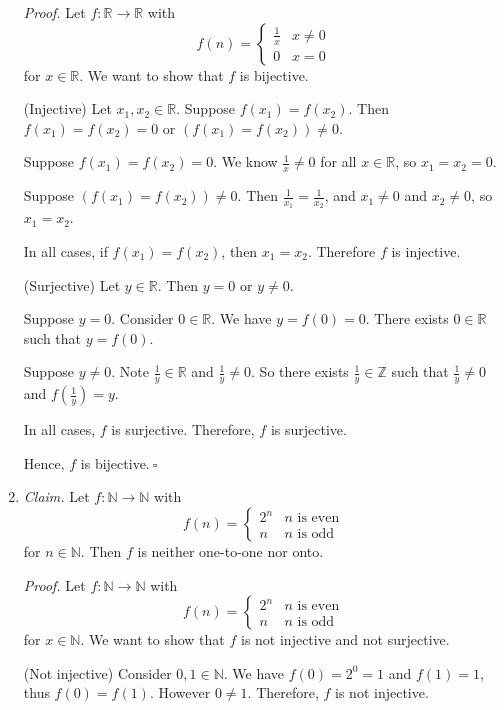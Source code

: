 \documentclass{article}
\newcommand{\Z}{\mathbb{Z}}
\newcommand{\N}{\mathbb{N}}
\newcommand{\R}{\mathbb{R}}
\theoremstyle{definition}
\begin{document}
\begin{solution}
\begin{enumerate}
\textit{Proof. }Let $f:\R\to\R$ with 
\[f(n) = \begin{cases} 
\frac{1}{x}&x\neq 0\\
0&x=0
\end{cases}
\]
for $x\in\R$. We want to show that $f$ is bijective.\newline

(Injective) Let $x_1,x_2\in\R$. Suppose $f(x_1)=f(x_2)$. Then $f(x_1)=f(x_2)=0$ or $\left(f(x_1)=f(x_2)\right)\neq 0$.

Suppose $f(x_1)=f(x_2)=0$. We know $\frac{1}{x}\neq 0$ for all $x\in\R$, so $x_1=x_2=0$.

Suppose $\left(f(x_1)=f(x_2)\right)\neq 0$. Then $\frac{1}{x_1}=\frac{1}{x_2}$, and $x_1\neq 0$ and $x_2\neq 0$, so $x_1=x_2$.

In all cases, if $f(x_1)=f(x_2)$, then $x_1=x_2$. Therefore $f$ is injective.\newline

(Surjective) Let $y\in\R$. Then $y=0$ or $y\neq 0$.

Suppose $y=0$. Consider $0\in\R$. We have $y=f(0)=0$. There exists $0\in\R$ such that $y=f(0)$.

Suppose $y\neq 0$. Note $\frac{1}{y}\in\R$ and $\frac{1}{y}\neq 0$. So there exists $\frac{1}{y}\in\Z$ such that $\frac{1}{y}\neq 0$ and $f\left(\frac{1}{y}\right)=y$.

In all cases, $f$ is surjective. Therefore, $f$ is surjective.\newline

Hence, $f$ is bijective.$~\square$
\item\textit{Claim. }Let $f:\N\to\N$ with 
\[f(n) = \begin{cases} 
2^n&n\text{ is even}\\
n&n\text{ is odd}
\end{cases}
\]
for $n\in\N$. Then $f$ is neither one-to-one nor onto.\newline

\textit{Proof. }Let $f:\N\to\N$ with 
\[f(n) = \begin{cases} 
2^n&n\text{ is even}\\
n&n\text{ is odd}
\end{cases}
\]
for $x\in\N$. We want to show that $f$ is not injective and not surjective.\newline

(Not injective) Consider $0,1\in\N$. We have $f(0)=2^0=1$ and $f(1)=1$, thus $f(0)=f(1)$. However $0\neq 1$. Therefore, $f$ is not injective.\newline


\end{enumerate}
\end{solution}
\end{document}
